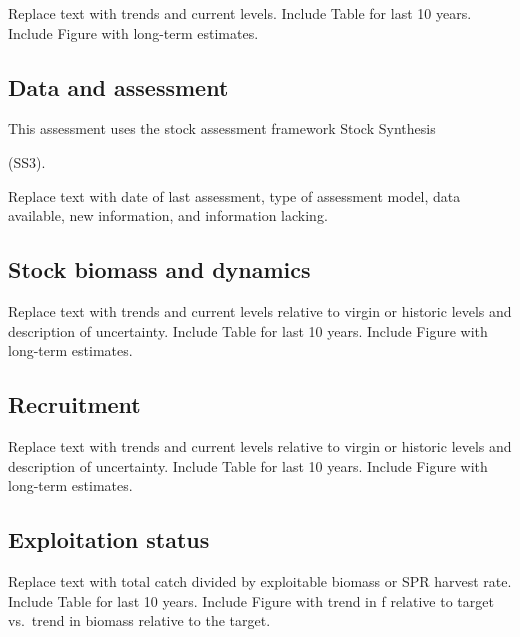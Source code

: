 \documentclass[11pt,
  english,
  letterpaper,
]{article}
\begin{document}
Replace text with trends and current levels. Include Table for last 10 years. Include Figure with long-term estimates.

\hypertarget{data-and-assessment}{%
\subsection*{Data and assessment}\label{data-and-assessment}}

This assessment uses the stock assessment framework Stock Synthesis

(SS3).

Replace text with date of last assessment, type of assessment model, data available, new information, and information lacking.

\hypertarget{stock-biomass-and-dynamics}{%
\subsection*{Stock biomass and dynamics}\label{stock-biomass-and-dynamics}}

Replace text with trends and current levels relative to virgin or historic levels and description of uncertainty. Include Table for last 10 years. Include Figure with long-term estimates.

\hypertarget{recruitment}{%
\subsection*{Recruitment}\label{recruitment}}

Replace text with trends and current levels relative to virgin or historic levels and description of uncertainty. Include Table for last 10 years. Include Figure with long-term estimates.

\hypertarget{exploitation-status}{%
\subsection*{Exploitation status}\label{exploitation-status}}

Replace text with total catch divided by exploitable biomass or SPR harvest rate. Include Table for last 10 years. Include Figure with trend in f relative to target vs.~trend in biomass relative to the target.
\end{document}
